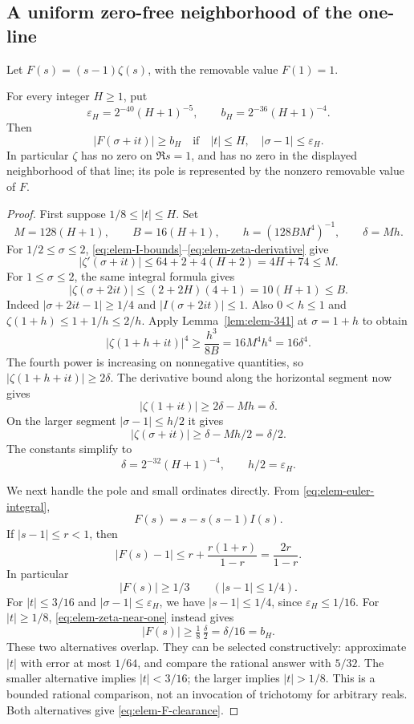 \subsection{A uniform zero-free neighborhood of the one-line}

Let $F(s)=(s-1)\zeta(s)$, with the removable value $F(1)=1$.

\begin{theorem}
\label{thm:elem-F-clearance}
For every integer $H\ge1$, put
\[
 \varepsilon_H=2^{-40}(H+1)^{-5},\qquad
 b_H=2^{-36}(H+1)^{-4}.
\]
Then
\begin{equation}
 |F(\sigma+it)|\ge b_H
 \quad\text{if}\quad |t|\le H,\quad
 |\sigma-1|\le\varepsilon_H.
 \label{eq:elem-F-clearance}
\end{equation}
In particular $\zeta$ has no zero on $\Re s=1$, and has no zero in
the displayed neighborhood of that line; its pole is represented by
the nonzero removable value of $F$.
\end{theorem}

\begin{proof}
First suppose $1/8\le|t|\le H$.  Set
\[
 M=128(H+1),\qquad B=16(H+1),\qquad
 h=(128BM^4)^{-1},\qquad\delta=Mh.
\]
For $1/2\le\sigma\le2$,
\eqref{eq:elem-I-bounds}--\eqref{eq:elem-zeta-derivative} give
\[
 |\zeta'(\sigma+it)|
 \le64+2+4(H+2)=4H+74\le M.
\]
For $1\le\sigma\le2$, the same integral formula gives
\[
 |\zeta(\sigma+2it)|
 \le(2+2H)(4+1)=10(H+1)\le B.
\]
Indeed $|\sigma+2it-1|\ge1/4$ and $|I(\sigma+2it)|\le1$.
Also $0<h\le1$ and
$\zeta(1+h)\le1+1/h\le2/h$.  Apply
Lemma~\ref{lem:elem-341} at $\sigma=1+h$ to obtain
\[
 |\zeta(1+h+it)|^4
 \ge\frac{h^3}{8B}=16M^4h^4=16\delta^4.
\]
The fourth power is increasing on nonnegative quantities, so
$|\zeta(1+h+it)|\ge2\delta$.  The derivative bound along the
horizontal segment now gives
\[
 |\zeta(1+it)|\ge2\delta-Mh=\delta.
\]
On the larger segment $|\sigma-1|\le h/2$ it gives
\begin{equation}
 |\zeta(\sigma+it)|\ge\delta-Mh/2=\delta/2.
 \label{eq:elem-zeta-near-one}
\end{equation}
The constants simplify to
\[
 \delta=2^{-32}(H+1)^{-4},\qquad h/2=\varepsilon_H.
\]

We next handle the pole and small ordinates directly.  From
\eqref{eq:elem-euler-integral},
\[
 F(s)=s-s(s-1)I(s).
\]
If $|s-1|\le r<1$, then
\[
 |F(s)-1|\le r+\frac{r(1+r)}{1-r}
 =\frac{2r}{1-r}.
\]
In particular
\begin{equation}
 |F(s)|\ge1/3\qquad (|s-1|\le1/4).
 \label{eq:elem-pole-disk}
\end{equation}
For $|t|\le3/16$ and $|\sigma-1|\le\varepsilon_H$, we have
$|s-1|\le1/4$, since $\varepsilon_H\le1/16$.  For
$|t|\ge1/8$, \eqref{eq:elem-zeta-near-one} instead gives
\[
 |F(s)|\ge\tfrac18\,\tfrac\delta2
 =\delta/16=b_H.
\]
These two alternatives overlap.  They can be selected constructively:
approximate $|t|$ with error at most $1/64$, and compare the rational
answer with $5/32$.  The smaller alternative implies $|t|<3/16$;
the larger implies $|t|>1/8$.  This is a bounded rational comparison,
not an invocation of trichotomy for arbitrary reals.  Both alternatives
give \eqref{eq:elem-F-clearance}.
\end{proof}

